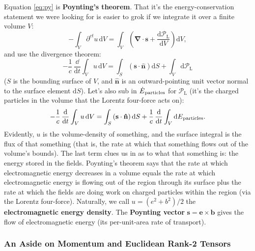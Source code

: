 \documentclass[12pt]{article}
\renewcommand{\vv}[1]{\mathbf{#1}}
\newcommand{\dd}[1]{\mathrm{d}#1}
\newcommand{\del}{\boldsymbol{\nabla}}
\begin{document}
Equation \ref{eq:py} is \textbf{Poynting's theorem}. That it's the energy-conservation statement we were looking for is easier to grok if we integrate it over a finite volume $V$:
\begin{equation*}
- \int_V \partial^{ct} u \, \dd V = \int_V \left(  \del \cdot \vv s + \dfrac{\dd \mathcal{P}_{\textrm{L}}}{\dd V} \right) \dd V ,
\end{equation*}
and use the divergence theorem:
\begin{equation*}
- \dfrac{1}{c} \, \dfrac{\dd}{\dd t} \int_V u \, \dd V = \int_S \left( \vv s \cdot \vv{\hat{n}} \right) \dd S + \int_V \dd \mathcal{P}_{\textrm{L}} 
\end{equation*}
($S$ is the bounding surface of $V$, and $\vv{\hat{n}}$ is an outward-pointing unit vector normal to the surface element $\dd S$). Let's also sub in $\dot{E}_{\mkern1mu \textrm{particles}}$ for $\mathcal{P}_{\textrm{L}}$ (it's the charged particles in the volume that the Lorentz four-force acts on):
\begin{equation*}
- \dfrac{1}{c} \, \dfrac{\dd}{\dd t} \int_V u \, \dd V = \int_S \left( \vv s \cdot \vv{\hat{n}} \right) \dd S + \dfrac{1}{c} \, \dfrac{\dd}{\dd t} \int_V \dd E_{\mkern1mu \textrm{particles}}.
\end{equation*}
Evidently, $u$ is the volume-density of something, and the surface integral is the flux of that something (that is, the rate at which that something flows out of the volume's bounds). The last term clues us in as to what that something is: the energy stored in the fields. Poynting's theorem says that the rate at which electromagnetic energy decreases in a volume equals the rate at which electromagnetic energy is flowing out of the region through its surface plus the rate at which the fields are doing work on charged particles within the region (via the Lorentz four-force). Naturally, we call $u = (e^2 + b^2)/2$ the \textbf{electromagnetic energy density}. The \textbf{Poynting vector} $\vv s = \vv e \times \vv b$ gives the flow of electromagnetic energy (its per-unit-area rate of transport).


\subsubsection{An Aside on Momentum and Euclidean Rank-2 Tensors}
\end{document}
